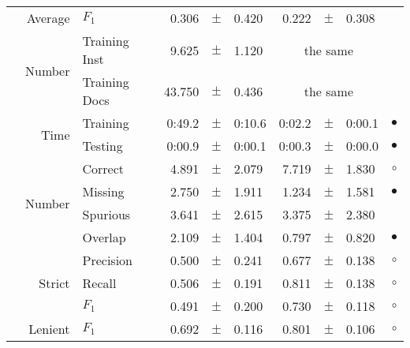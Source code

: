 \begin{longtable}{|r|r|l||rcl|rcl|c|}
\cline{2-10} &                     Average &           $F_1$ &       0.306 &  $\pm$  &       0.420 &       0.222 &  $\pm$  &       0.308 &  \\
\cline{2-10} & \multirow{2}{*}{    Number} &   Training Inst &       9.625 &  $\pm$  &       1.120 &    \multicolumn{3}{c|}{the same}         &  \\
\cline{3-10} &                             &   Training Docs &      43.750 &  $\pm$  &       0.436 &    \multicolumn{3}{c|}{the same}         &  \\
\cline{2-10} & \multirow{2}{*}{      Time} &        Training &      0:49.2 &  $\pm$  &      0:10.6 &      0:02.2 &  $\pm$  &      0:00.1 & $\bullet$ \\
\cline{3-10} &                             &         Testing &      0:00.9 &  $\pm$  &      0:00.1 &      0:00.3 &  $\pm$  &      0:00.0 & $\bullet$ \\
\hline
\pagebreak
\hline
\hline
\multirow{11}{*}{\begin{sideways}professional unit\end{sideways} }
             & \multirow{4}{*}{    Number} &         Correct &       4.891 &  $\pm$  &       2.079 &       7.719 &  $\pm$  &       1.830 & $\circ$ \\
\cline{3-10} &                             &         Missing &       2.750 &  $\pm$  &       1.911 &       1.234 &  $\pm$  &       1.581 & $\bullet$ \\
\cline{3-10} &                             &        Spurious &       3.641 &  $\pm$  &       2.615 &       3.375 &  $\pm$  &       2.380 &  \\
\cline{3-10} &                             &         Overlap &       2.109 &  $\pm$  &       1.404 &       0.797 &  $\pm$  &       0.820 & $\bullet$ \\
\cline{2-10} & \multirow{3}{*}{    Strict} &       Precision &       0.500 &  $\pm$  &       0.241 &       0.677 &  $\pm$  &       0.138 & $\circ$ \\
\cline{3-10} &                             &          Recall &       0.506 &  $\pm$  &       0.191 &       0.811 &  $\pm$  &       0.138 & $\circ$ \\
\cline{3-10} &                             &           $F_1$ &       0.491 &  $\pm$  &       0.200 &       0.730 &  $\pm$  &       0.118 & $\circ$ \\
\cline{2-10} &                     Lenient &           $F_1$ &       0.692 &  $\pm$  &       0.116 &       0.801 &  $\pm$  &       0.106 & $\circ$ \\

\end{longtable}
